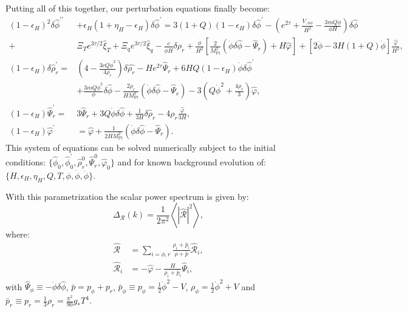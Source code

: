 Putting all of this together, our perturbation equations finally become:
\begin{align}
    (1-\epsilon_H)^2\delta \hat{\phi}^{\prime\prime}&+\epsilon_H(1+\eta_H-\epsilon_H)\delta\hat{\phi}^\prime=3 (1+Q)(1-\epsilon_H) \delta \hat{\phi}^\prime-\left(e^{2\tau}+\frac{V_{, \phi \phi}}{H^2}-\frac{3mQ \dot{\phi}}{\phi H}\right) \delta \hat{\phi} \nonumber \\+& \Xi_T e^{3\tau/2}\hat{\xi}_T+\Xi_q e^{3\tau/2}\hat{\xi}_q-\frac{c}{\dot{\phi}H} \delta \rho_r+\frac{\dot{\phi}}{H^2}\left[\frac{2}{ M_{\mathrm{Pl}}^2}\left(\dot{\phi} \delta \hat{\phi}-\hat{\Psi}_r\right)+H\hat{\varphi}\right]+[2 \ddot{\phi}-3 H(1+Q) \dot{\phi}]\frac{ \hat{\varphi}}{H^2}, \label{eq:Gab2.1} \\ (1-\epsilon_H)\delta \hat{\rho}^\prime_r=&\left(4-\frac{3c Q \dot{\phi}^2}{4 \rho_r}\right) \delta \hat{\rho_r}-He^{2\tau}\hat{\Psi}_r+6 H Q (1-\epsilon_H)\dot{\phi} \delta \hat{\phi}^\prime \nonumber\\ &+\frac{3m Q \dot{\phi}^2}{\phi} \delta \hat{\phi}-\frac{2 \rho_r}{ H M_{\mathrm{Pl}}^2} \left(\dot{\phi} \delta \hat{\phi}-\hat{\Psi}_r\right)-3\left(Q \dot{\phi}^2+\frac{4 \rho_r}{3}\right) \hat{\varphi}, \label{eq:Gab2.2}\\ (1-\epsilon_H)\hat{\Psi}^\prime_r=&3 \hat{\Psi}_r+3Q \dot{\phi} \delta \hat{\phi}+\frac{1}{3H} \delta \hat{\rho}_r-4 \rho_r \frac{\hat{\varphi}}{3H}, \label{eq:Gab2.3} \\
      (1-\epsilon_H)\hat{\varphi}^\prime& = \hat{\varphi}+ \frac{1}{2H M_{\mathrm{Pl}}^2}\left(\dot{\phi} \delta \hat{\phi}-\hat{\Psi}_r\right). \label{eq:Gab2.4}
\end{align}
This system of equations can be solved numerically subject to the initial conditions: $\{\hat{\phi}_0,\hat{\phi}^\prime_0,\hat{\rho}^0_r,\hat{\Psi}^0_r,\hat{\varphi}_0\}$ and for known background evolution of: $\{H,\epsilon_H,\eta_H,Q,T,\phi,\dot{\phi},\ddot{\phi}\}$.

With this parametrization the scalar power spectrum is given by:
\begin{equation}
    \Delta_{\mathcal{R}}(k)=\frac{1}{2 \pi^2}\left\langle|\hat{\mathcal{R}}|^2\right\rangle,
\end{equation}
where:
\begin{align}
    \hat{\mathcal{R}}&=\sum_{i=\phi, r} \frac{\rho_i+\bar{p}_i}{\rho+\bar{p}} \hat{\mathcal{R}}_i, \\
    \hat{\mathcal{R}}_i&=-\hat{\varphi}-\frac{H}{\rho_i+\bar{p}_i} \hat{\Psi}_i,
\end{align}
with $\hat{\Psi}_\phi\equiv -\dot{\phi}\delta \hat{\phi}$, $\bar{p}=p_\phi+p_r$, $\bar{p}_\phi \equiv p_\phi=\frac{1}{2}\dot{\phi}^2-V$, $\rho_\phi=\frac{1}{2}\dot{\phi}^2+V$ and $\bar{p}_r\equiv p_r=\frac{1}{3}\rho_r=\frac{\pi^2}{90}g_{*}T^4$.

